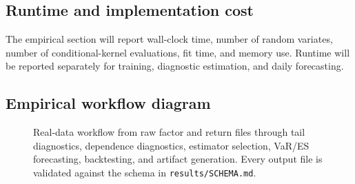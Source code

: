 \begin{table}[p]
\centering

\caption[Real-data experiment registry]{Planned real-data experiment registry. Experiment descriptors, estimator
candidates, forecast levels, and output identifiers are populated; the
status/outcome column remains \xx{} until the run registry is populated.}
\label{tab:realdata-experiments-current}
\end{table}

\begin{table}[p]
\centering

\caption[Real-data figure replacement registry]{Planned real-data figure
replacement registry. Each placeholder figure has a source CSV and replacement
rule so that visual results can be regenerated without changing labels or
captions. The cells in this table are real categorical descriptors.}
\label{tab:planned-real-data-figures-current}
\end{table}

\subsection{Runtime and implementation cost}

The empirical section will report wall-clock time, number of random variates,
number of conditional-kernel evaluations, fit time, and memory use. Runtime
will be reported separately for training, diagnostic estimation, and daily
forecasting.

\begin{table}[p]
\centering

\caption[Runtime]{Runtime and
computational-cost placeholder. Values are \xx{} placeholders. The final
table will report per-date forecast cost, per-replicate cost, total runtime,
and work-normalized relative error for each estimator.}
\label{tab:runtime-placeholder}
\end{table}

\subsection{Empirical workflow diagram}

\begin{figure}[p]
\centering

\caption[Real-data workflow]{Real-data workflow from raw factor and return
files through tail diagnostics, dependence diagnostics, estimator selection,
VaR/ES forecasting, backtesting, and artifact generation. Every output file
is validated against the schema in \texttt{results/SCHEMA.md}.}
\label{fig:real-data-workflow}
\end{figure}



